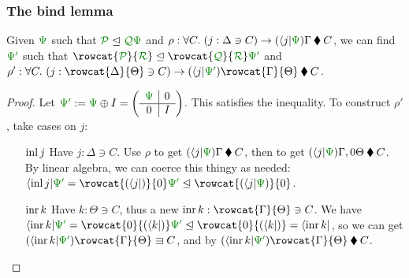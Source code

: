 \documentclass[fleqn]{beamer}
\begin{document}
\begin{frame}
  \frametitle{The bind lemma}
  \begin{lemma}
    Given $\rescomment\Psi$ such that $\resctx P \subres \resctx Q\rescomment\Psi$
    and $\rho : \forall C.~(j : \Delta \ni C) \to
    (\basis j\rescomment\Psi)\Gamma \kitrel C$, we can find $\rescomment{\Psi'}$
    such that $\rowcat{\resctx P}{\resctx R} \subres
    \rowcat{\resctx Q}{\resctx R}\rescomment{\Psi'}$ and
    $\rho' : \forall C.~(j : \rowcat{\Delta}{\Theta} \ni C) \to
    (\basis j\rescomment{\Psi'})\rowcat{\Gamma}{\Theta} \kitrel C$.
  \end{lemma}
  \begin{proof}
    Let $\rescomment{\Psi'} := \rescomment\Psi \oplus I =
    \left(\begin{array}{c|c}
            \rescomment\Psi & 0 \\\hline 0 & I
          \end{array}\right)$.
    This satisfies the inequality.
    To construct $\rho'$, take cases on $j$:
    \begin{itemize}
      \item[$\operatorname{inl} j$]
        Have $j : \Delta \ni C$.
        Use $\rho$ to get $(\basis j\rescomment\Psi)\Gamma \kitrel C$, then
         to get
        $(\basis j\rescomment\Psi)\Gamma, 0\Theta \kitrel C$.
        By linear algebra, we can coerce this thingy as needed:
        $\basis{\inl j}\rescomment{\Psi'}
        = \rowcat{(\basis j)}{0}\rescomment{\Psi'}
        \subres \rowcat{(\basis j\rescomment{\Psi})}{0}$.
      \item[$\operatorname{inr} k$]
        Have $k : \Theta \ni C$, thus a new
        $\inr k : \rowcat{\Gamma}{\Theta} \ni C$.
        We have $\basis{\inr k}\rescomment{\Psi'}
        = \rowcat{0}{(\basis k)}\rescomment{\Psi'}
        \subres \rowcat{0}{(\basis k)}
        = \basis{\inr k}$, so we can get
        $(\basis{\inr k}\rescomment{\Psi'})\rowcat{\Gamma}{\Theta} \lvar C$,
        and by 
        $(\basis{\inr k}\rescomment{\Psi'})\rowcat{\Gamma}{\Theta} \kitrel C$.
    \end{itemize}
  \end{proof}
\end{frame}
\end{document}
